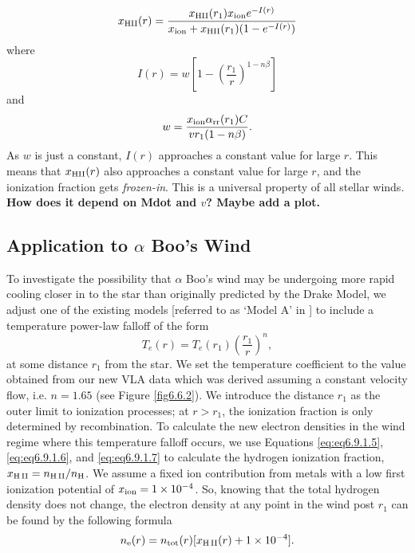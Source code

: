 \begin{equation}
x_{\rm{HII}}(r)=\frac{x_{\rm{HII}}(r_1)x_{\rm{ion}}e^{-I(r)}}{x_{\rm{ion}}+x_{\rm{HII}}(r_1)(1-e^{-I(r)})}
\label{eq:eq6.9.1.5}
\end{equation}
where
\begin{equation}
I(r)=w\left[1-\left(\frac{r_1}{r}\right)^{1-n\beta} \right]
\label{eq:eq6.9.1.6}
\end{equation}
and 
\begin{equation}
w=\frac{x_{\rm{ion}}\alpha_{\rm{rr}}(r_1)C}{vr_1(1-n\beta)}.
\label{eq:eq6.9.1.7}
\end{equation}
As $w$ is just a constant, $I(r)$ approaches a constant value for large $r$. This means that $x_{\rm{HII}}(r)$ also approaches a constant value for large $r$, and the ionization fraction gets \textit{frozen-in}. This is a universal property of all stellar winds. \textbf{How does it depend on Mdot and $v$? Maybe add a plot.}

\subsection{Application to $\alpha$ Boo's Wind}\label{sec:6.6.2}
To investigate the possibility that $\alpha$ Boo's wind may be undergoing more rapid cooling closer in to the star than originally predicted by the Drake Model, we adjust one of the existing models [referred to as `Model A' in \cite{drake_1985}] to include a temperature power-law falloff of the form
\begin{equation}
T_{e}(r)= T_{e}(r_{1})\left(\frac{r_{1}}{r}\right)^{n},
\label{eq:eq2}
\end{equation}
at some distance $r_{1}$ from the star. We set the temperature coefficient to the value obtained from our new VLA data which was derived assuming a constant velocity flow, i.e. $n=1.65$ (see Figure \ref{fig6.6.2}). We introduce the distance $r_{1}$ as the outer limit to ionization processes; at $r > r_{1}$, the ionization fraction is only determined by recombination. To calculate the new electron densities in the wind regime where this temperature falloff occurs, we use Equations \ref{eq:eq6.9.1.5}, \ref{eq:eq6.9.1.6}, and \ref{eq:eq6.9.1.7} to calculate the hydrogen ionization fraction, $x_{\rm{H \, II}}=n_{\rm{H \, II}}/n_{\rm{H}}$. We assume a fixed ion contribution from metals with a low first ionization potential of $x_{\rm{ion}} = 1 \times 10^{-4}$. So, knowing that the total hydrogen density does not change, the electron density at any point in the wind post $r_1$ can be found by the following formula
\begin{equation}
n_{\rm{e}}(r)=n_{\rm{tot}}(r)[x_{\rm{H \, II}}(r) + 1\times 10^{-4}].
\end{equation}

